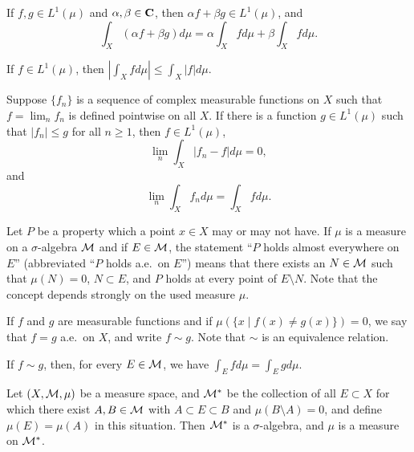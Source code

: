 \begin{theorem}
  If $f, g \in L^1(\mu)$ and $\alpha,\beta \in \mathbf{C}$, then $\alpha f + \beta g \in L^1(\mu)$, and
  \[
  \int_X (\alpha f + \beta g) d\mu = \alpha \int_X f d\mu + \beta \int_X f d\mu.
  \]
\end{theorem}

\begin{theorem}
  If $f \in L^1(\mu)$, then $\left| \int_X f d\mu \right| \leq \int_X |f| d\mu$.
\end{theorem}

\begin{theorem}
  Suppose $\{f_n\}$ is a sequence of complex measurable functions on $X$ such that $f = \lim_n f_n$ is defined pointwise on all $X$. If there is a function $g \in L^1(\mu)$ such that $|f_n| \leq g$ for all $n \geq 1$, then $f \in L^1(\mu)$,
  \[
  \lim_n \int_X |f_n - f| d\mu = 0,
  \]
  and
  \[
  \lim_n \int_X f_n d\mu = \int_X f d\mu.
  \]
\end{theorem}

\begin{definition}
  Let $P$ be a property which a point $x \in X$ may or may not have. If $\mu$ is a measure on a $\sigma$-algebra $\mathcal{M}$ and if $E \in \mathcal{M}$, the statement ``$P$ holds almost everywhere on $E$'' (abbreviated ``$P$ holds a.e.\ on $E$'') means that there exists an $N \in \mathcal{M}$ such that $\mu(N) = 0$, $N \subset E$, and $P$ holds at every point of $E \setminus N$. Note that the concept depends strongly on the used measure $\mu$.
\end{definition}

\begin{definition}
  If $f$ and $g$ are measurable functions and if $\mu(\{ x \;|\; f(x) \neq g(x) \}) = 0$, we say that $f = g$ a.e.\ on $X$, and write $f \sim g$. Note that $\sim$ is an equivalence relation.
\end{definition}

\begin{proposition}
  If $f \sim g$, then, for every $E \in \mathcal{M}$, we have $\int_E f d\mu = \int_E g d\mu$.
\end{proposition}

\begin{theorem}
  Let $(X, \mathcal{M}, \mu)$ be a measure space, and $\mathcal{M}^\ast$ be the collection of all $E \subset X$ for which there exist $A, B \in \mathcal{M}$ with $A \subset E \subset B$ and $\mu(B \setminus A) = 0$, and define $\mu(E) = \mu(A)$ in this situation. Then $\mathcal{M}^\ast$ is a $\sigma$-algebra, and $\mu$ is a measure on $\mathcal{M}^\ast$.
\end{theorem}

